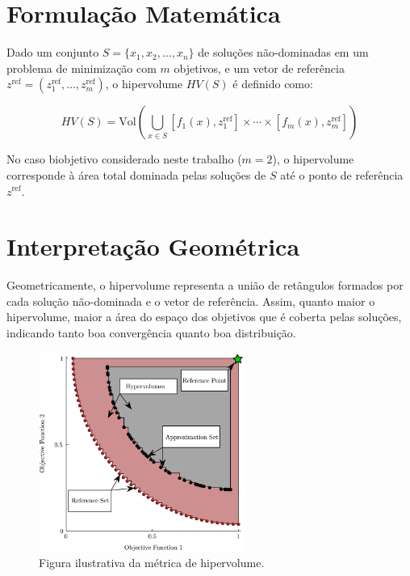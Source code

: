 \documentclass[
	12pt,				%
	oneside,			%
	a4paper,			%
	chapter=TITLE,
	sumario=tradicional,
	english,			%
	brazil				%
]{abntex2}
\begin{document}
\section{Formulação Matemática}

Dado um conjunto $S = \{x_1, x_2, \dots, x_n\}$ de soluções não-dominadas em um problema de minimização com $m$ objetivos, e um vetor de
referência $z^{\text{ref}} = (z_1^{\text{ref}}, \dots, z_m^{\text{ref}})$, o hipervolume $HV(S)$ é definido como:

\begin{equation}
HV(S) = \text{Vol} \left( \bigcup_{x \in S} [f_1(x), z_1^{\text{ref}}] \times \cdots \times [f_m(x), z_m^{\text{ref}}] \right)
\end{equation}

No caso biobjetivo considerado neste trabalho ($m = 2$), o hipervolume corresponde à área total dominada pelas soluções de $S$ até o
ponto de referência $z^{\text{ref}}$.

\section{Interpretação Geométrica}

Geometricamente, o hipervolume representa a união de retângulos formados por cada solução não-dominada e o vetor de referência.
Assim, quanto maior o hipervolume, maior a área do espaço dos objetivos que é coberta pelas soluções, indicando tanto boa convergência quanto boa distribuição.

\begin{figure}[h!]
	\caption{\label{fig:hypervolume}Figura ilustrativa da métrica de hipervolume.}
	\begin{center}
    \includegraphics[width=0.6\textwidth,clip]{Illustration-hypervolume-metric.png}
	\end{center}
\end{figure}
\end{document}
